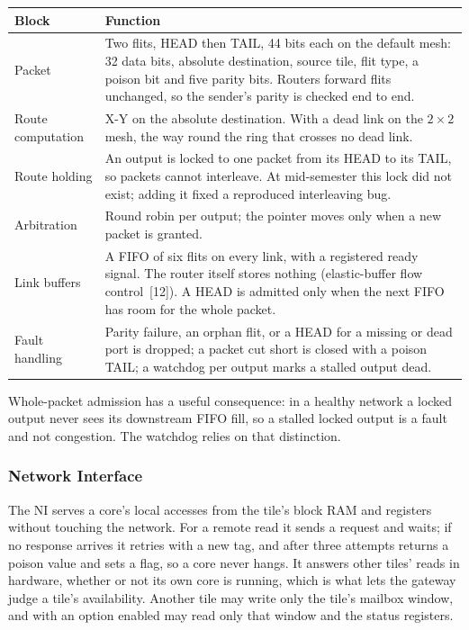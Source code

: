 \documentclass[11pt,a4paper]{article}
\begin{document}
\begin{tabularx}{\textwidth}{@{}lY@{}}
\toprule
\textbf{Block} & \textbf{Function} \\
\midrule
Packet & Two flits, HEAD then TAIL, 44 bits each on the default mesh: 32 data
bits, absolute destination, source tile, flit type, a poison bit and five
parity bits. Routers forward flits unchanged, so the sender's parity is
checked end to end. \\
Route computation & X-Y on the absolute destination. With a dead link on the
$2\times2$ mesh, the way round the ring that crosses no dead link. \\
Route holding & An output is locked to one packet from its HEAD to its TAIL,
so packets cannot interleave. At mid-semester this lock did not exist; adding
it fixed a reproduced interleaving bug. \\
Arbitration & Round robin per output; the pointer moves only when a new packet
is granted. \\
Link buffers & A FIFO of six flits on every link, with a registered ready
signal. The router itself stores nothing (elastic-buffer flow control~[12]).
A HEAD is admitted only when the next FIFO has room for the whole packet. \\
Fault handling & Parity failure, an orphan flit, or a HEAD for a missing or
dead port is dropped; a packet cut short is closed with a poison TAIL; a
watchdog per output marks a stalled output dead. \\
\bottomrule
\end{tabularx}

Whole-packet admission has a useful consequence: in a healthy network a locked
output never sees its downstream FIFO fill, so a stalled locked output is a
fault and not congestion. The watchdog relies on that distinction.

\subsubsection{Network Interface}

The NI serves a core's local accesses from the tile's block RAM and registers
without touching the network. For a remote read it sends a request and waits;
if no response arrives it retries with a new tag, and after three attempts
returns a poison value and sets a flag, so a core never hangs. It answers
other tiles' reads in hardware, whether or not its own core is running, which
is what lets the gateway judge a tile's availability. Another tile may write
only the tile's mailbox window, and with an option enabled may read only that
window and the status registers.
\end{document}
